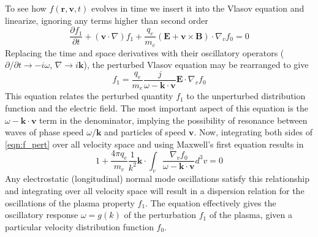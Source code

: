 To see how $f(\mathbf{r}, \mathbf{v}, t)$ evolves in time we insert it into the Vlasov equation and linearize, ignoring any terms higher than second order
\begin{equation}
\frac{\partial f_1}{\partial t} + (\mathbf{v}\cdot \nabla)f_1 +\frac{q_e}{m_e}(\mathbf{E} + \mathbf{v}\times \mathbf{B})\cdot\nabla_vf_0=0
\end{equation}
Replacing the time and space derivatives with their oscillatory operators ($\partial/\partial t \rightarrow -i\omega$, $\nabla \rightarrow i\mathbf{k}$), the perturbed Vlasov equation may be rearranged to give
\begin{equation}
f_1=\frac{q_e}{m_e}\frac{j}{\omega-\mathbf{k\cdot v}}\mathbf{E}\cdot\nabla_vf_0
\label{eqn:f_pert}
\end{equation}
This equation relates the perturbed quantity $f_1$ to the unperturbed distribution function and the electric field. The most important aspect of this equation is the $\omega-\mathbf{k\cdot v}$ term in the denominator, implying the possibility of resonance between waves of phase speed $\omega/\mathbf{k}$ and particles of speed $\mathbf{v}$. Now, integrating both sides of \ref{eqn:f_pert} over all velocity space and using Maxwell's first equation results in
\begin{equation}
1+\frac{4\pi q_e}{m_e}\frac{1}{k^2}\mathbf{k}\cdot\int_v\frac{\nabla_v f_0}{\omega-\mathbf{k\cdot v}}d^3v=0
\label{eqn:dispersion}
\end{equation}
Any electrostatic (longitudinal) normal mode oscillations satisfy this relationship and integrating over all velocity space will result in a dispersion relation for the oscillations of the plasma property $f_1$. The equation effectively gives the oscillatory response $\omega = g(k)$ of the perturbation $f_1$ of the plasma, given a particular velocity distribution function $f_0$. 


